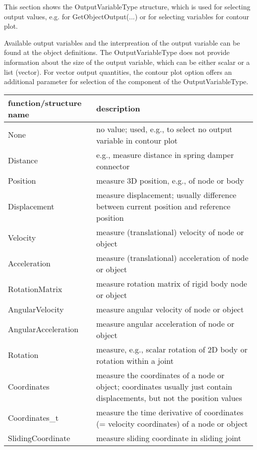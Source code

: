 This section shows the OutputVariableType structure, which is used for selecting output values, e.g. for GetObjectOutput(...) or for selecting variables for contour plot.

Available output variables and the interpreation of the output variable can be found at the object definitions. 
 The OutputVariableType does not provide information about the size of the output variable, which can be either scalar or a list (vector). For vector output quantities, the contour plot option offers an additional parameter for selection of the component of the OutputVariableType.


\begin{center}
\footnotesize
\begin{longtable}{| p{8cm} | p{8cm} |} 
\hline
{\bf function/structure name} & {\bf description}\\ \hline
  None & no value; used, e.g., to select no output variable in contour plot\\ \hline 
  Distance & e.g., measure distance in spring damper connector\\ \hline 
  Position & measure 3D position, e.g., of node or body\\ \hline 
  Displacement & measure displacement; usually difference between current position and reference position\\ \hline 
  Velocity & measure (translational) velocity of node or object\\ \hline 
  Acceleration & measure (translational) acceleration of node or object\\ \hline 
  RotationMatrix & measure rotation matrix of rigid body node or object\\ \hline 
  AngularVelocity & measure angular velocity of node or object\\ \hline 
  AngularAcceleration & measure angular acceleration of node or object\\ \hline 
  Rotation & measure, e.g., scalar rotation of 2D body or rotation within a joint\\ \hline 
  Coordinates & measure the coordinates of a node or object; coordinates usually just contain displacements, but not the position values\\ \hline 
  Coordinates\_t & measure the time derivative of coordinates (= velocity coordinates) of a node or object\\ \hline 
  SlidingCoordinate & measure sliding coordinate in sliding joint\\ \hline 

\end{longtable}
\end{center}
